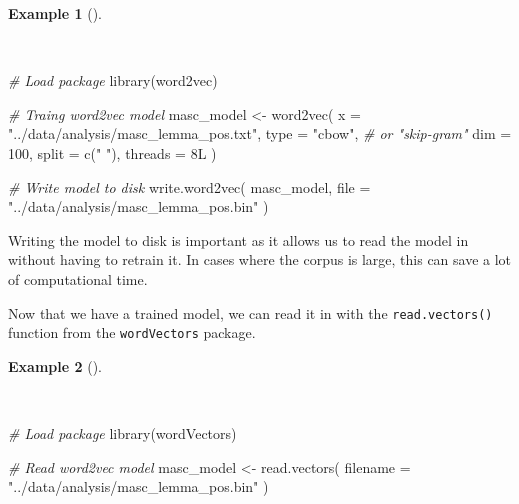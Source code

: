 \documentclass[
  letterpaper,
]{latex/krantz}
\newenvironment{Shaded}{\begin{snugshade}}{\end{snugshade}}
\newcommand{\AttributeTok}[1]{\textcolor[rgb]{0.00,0.00,0.00}{#1}}
\newcommand{\CommentTok}[1]{\textcolor[rgb]{0.00,0.00,0.00}{\textit{#1}}}
\newcommand{\DecValTok}[1]{\textcolor[rgb]{0.00,0.00,0.00}{#1}}
\newcommand{\FunctionTok}[1]{\textcolor[rgb]{0.00,0.00,0.00}{#1}}
\newcommand{\NormalTok}[1]{\textcolor[rgb]{0.00,0.00,0.00}{#1}}
\newcommand{\OtherTok}[1]{\textcolor[rgb]{0.00,0.00,0.00}{#1}}
\newcommand{\StringTok}[1]{\textcolor[rgb]{0.00,0.00,0.00}{#1}}
\theoremstyle{definition}
\newtheorem{example}{Example}[chapter]
\theoremstyle{remark}
\begin{document}
\begin{example}[]\protect\hypertarget{exm-eda-masc-vsm-word2vec-train}{}\label{exm-eda-masc-vsm-word2vec-train}

~

\begin{Shaded}
\begin{Highlighting}[]
\CommentTok{\# Load package}
\FunctionTok{library}\NormalTok{(word2vec)}

\CommentTok{\# Traing word2vec model}
\NormalTok{masc\_model }\OtherTok{\textless{}{-}}
  \FunctionTok{word2vec}\NormalTok{(}
    \AttributeTok{x =} \StringTok{"../data/analysis/masc\_lemma\_pos.txt"}\NormalTok{,}
    \AttributeTok{type =} \StringTok{"cbow"}\NormalTok{, }\CommentTok{\# or "skip{-}gram"}
    \AttributeTok{dim =} \DecValTok{100}\NormalTok{,}
    \AttributeTok{split =} \FunctionTok{c}\NormalTok{(}\StringTok{" "}\NormalTok{),}
    \AttributeTok{threads =} \DecValTok{8}\NormalTok{L}
\NormalTok{  )}

\CommentTok{\# Write model to disk}
\FunctionTok{write.word2vec}\NormalTok{(}
\NormalTok{  masc\_model,}
  \AttributeTok{file =} \StringTok{"../data/analysis/masc\_lemma\_pos.bin"}
\NormalTok{)}
\end{Highlighting}
\end{Shaded}

\end{example}

Writing the model to disk is important as it allows us to read the model
in without having to retrain it. In cases where the corpus is large,
this can save a lot of computational time.

Now that we have a trained model, we can read it in with the
\texttt{read.vectors()} function from the \texttt{wordVectors} package.

\begin{example}[]\protect\hypertarget{exm-eda-masc-vsm-word2vec-read}{}\label{exm-eda-masc-vsm-word2vec-read}

~

\begin{Shaded}
\begin{Highlighting}[]
\CommentTok{\# Load package}
\FunctionTok{library}\NormalTok{(wordVectors)}

\CommentTok{\# Read word2vec model}
\NormalTok{masc\_model }\OtherTok{\textless{}{-}}
  \FunctionTok{read.vectors}\NormalTok{(}
    \AttributeTok{filename =} \StringTok{"../data/analysis/masc\_lemma\_pos.bin"}
\NormalTok{  )}
\end{Highlighting}
\end{Shaded}

\end{example}
\end{document}
